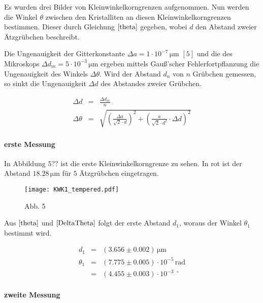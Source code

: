 \documentclass[12pt,a4paper]{scrartcl}
\numberwithin{equation}{section} %
\renewcommand{\[}{} %
\renewcommand{\]}{\noindent} %
\begin{document}
Es wurden drei Bilder von Kleinwinkelkorngrenzen aufgenommen. Nun werden
die Winkel \(\theta\) zwischen den Kristalliten an diesen
Kleinwinkelkorngrenzen bestimmen. Dieser durch Gleichung
\(\eqref{theta}\) gegeben, wobei \(d\) den Abstand zweier Ätzgrübchen
beschreibt.

Die Ungenauigkeit der Gitterkonstante
\(\Delta a=1 \cdot 10^{-7} \mathrm{\, \mu m}\) \([5]\) und die des
Mikroskops \(\Delta d_m = 5 \cdot 10^{-3} \mathrm{\, \mu m}\) ergeben
mittels Gauß'scher Fehlerfortpflanzung die Ungenauigkeit des Winkels
\(\Delta \theta\). Wird der Abstand \(d_n\) von \(n\) Grübchen gemessen,
so sinkt die Ungenauigkeit \(\Delta d\) des Abstandes zweier Grübchen.

\[
\begin{eqnarray}
    \Delta d &=& \frac{\Delta d_m}{n} \\
    \Delta \theta &=& \sqrt{
        \left(\frac{\Delta a}{\sqrt{2} \cdot d} \right)^2
            + \left( \frac{a}{\sqrt{2} \cdot d^2} \cdot \Delta d \right)^2 }
            \label{DeltaTheta}
\end{eqnarray}
\]

\hypertarget{erste-messung}{%
\paragraph{erste Messung}\label{erste-messung}}

In Abbildung \(5??\) ist die erste Kleinwinkelkorngrenze zu sehen. In
rot ist der Abstand \(18.28 \mathrm{\, \mu m}\) für \(5\) Ätzgrübchen
eingetragen.

\begin{figure}
\centering
\texttt{[image: KWK1\_tempered.pdf]}
\caption{Abb. 5}
\end{figure}

Aus \(\eqref{theta}\) und \(\eqref{DeltaTheta}\) folgt der erste Abstand
\(d_1\), woraus der Winkel \(\theta_1\) bestimmt wird.

\[
\begin{eqnarray}
    d_1 &=& (3.656 \pm 0.002) \mathrm{\, \mu m} \\
    \theta_1 &=& (7.775 \pm 0.005) \cdot 10^{-5} \mathrm{\, rad} \\
        &=& (4.455 \pm 0.003) \cdot 10^{-3\ \ \circ}
\end{eqnarray}
\]

\hypertarget{zweite-messung}{%
\paragraph{zweite Messung}\label{zweite-messung}}
\end{document}

